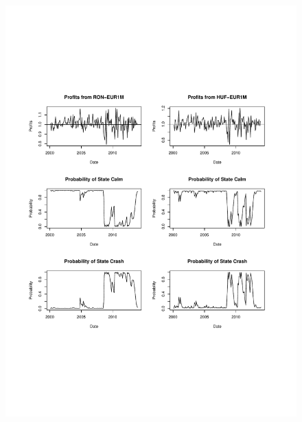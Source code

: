 \documentclass[12pt, a4paper, oneside]{article} %
\begin{document}
\begin{figure}[h!]
\centering
\includegraphics[scale = .80]{../Figures/2RegProb/RONHUFEUR.pdf}
\end{figure}
\end{document}
